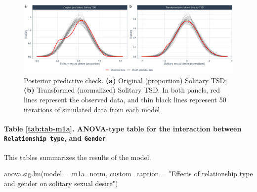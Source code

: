 \documentclass[
  bookmarksnumbered]{article}
\newenvironment{Shaded}{\begin{snugshade}}{\end{snugshade}}
\newcommand{\AttributeTok}[1]{\textcolor[rgb]{0.80,0.80,0.80}{#1}}
\newcommand{\FunctionTok}[1]{\textcolor[rgb]{0.94,0.94,0.56}{#1}}
\newcommand{\NormalTok}[1]{\textcolor[rgb]{0.80,0.80,0.80}{#1}}
\newcommand{\StringTok}[1]{\textcolor[rgb]{0.80,0.58,0.58}{#1}}
\begin{document}
\begin{figure}
\centering
\includegraphics{Sexual_Desire_Arousal_V2_files/figure-latex/ppc-m1a-1.pdf}
\caption{\label{fig:ppc-m1a}Posterior predictive check. \textbf{(a)} Original (proportion) Solitary TSD; \textbf{(b)} Transformed (normalized) Solitary TSD. In both panels, red lines represent the observed data, and thin black lines represent 50 iterations of simulated data from each model.}
\end{figure}

\paragraph{\texorpdfstring{Table \ref{tab:tab-m1a}. ANOVA-type table for the interaction between \texttt{Relationship\ type}, and \texttt{Gender}}{Table \ref{tab:tab-m1a}. ANOVA-type table for the interaction between Relationship type, and Gender}}\label{table-reftabtab-m1a.-anova-type-table-for-the-interaction-between-relationship-type-and-gender}

This tables summarizes the results of the model.

\begin{Shaded}
\begin{Highlighting}[]
\FunctionTok{anova.sig.lm}\NormalTok{(}\AttributeTok{model =}\NormalTok{ m1a\_norm, }\AttributeTok{custom\_caption =} \StringTok{"Effects of relationship type and gender on}
\StringTok{          solitary sexual desire"}\NormalTok{)}
\end{Highlighting}
\end{Shaded}
\end{document}
